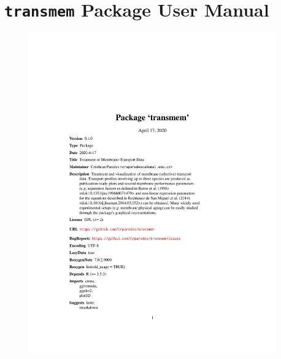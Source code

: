 \chapter{\texttt{transmem} Package User Manual}\label{sec:transmemManual}
\vspace{-1.5cm}
{
    \begin{figure}[H]\centering
        \includegraphics[width=0.95\textwidth, page = {1}, trim={1.6cm 3cm 1.6cm 7cm}, clip]{App/images/transmem_0.1.0.pdf}
    \end{figure}}

